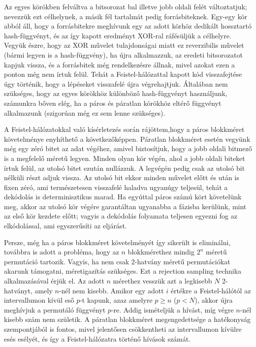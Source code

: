 \documentclass[
    parspace,
    noindent,
    nohyp,
]{elteiktdk}[2023/04/10]
\begin{document}
Az egyes körökben felváltva a bitsorozat bal illetve jobb oldali felét változtatjuk; nevezzük ezt célhelynek, a másik fél tartalmát pedig forrásbiteknek.
Egy-egy kör abból áll, hogy a forrásbitekre meghívunk egy az adott körhöz dedikált hossztartó hash-függvényt,
és az így kapott eredményt XOR-ral ráfésüljük a célhelyre.
Vegyük észre, hogy az XOR művelet tulajdonságai miatt ez reverzibilis művelet (bármi legyen is a hash-függvény),
ha újra alkalmazzuk, az eredeti bitsorozatot kapjuk vissza,
és a forrásbitek még rendelkezésre állnak, mivel azokat ezen a ponton még nem írtuk felül.
Tehát a Feistel-hálózattal kapott kód visszafejtése úgy történik, hogy a lépéseket visszafelé újra végrehajtjuk.
Általában nem szükséges, hogy az egyes körökhöz különböző hash-függvényt használjunk,
számunkra bőven elég, ha a páros és páratlan körökhöz eltérő függvényt alkalmazunk (szigorúan még ez sem lenne szükséges).

A Feistel-hálózatokkal való kísérletezés során rájöttem,hogy a páros blokkméret követelménye enyhíthető a következőképpen.
Páratlan blokkméret esetén vegyünk még egy zéró bitet az adat végéhez,
amivel biztosítjuk, hogy a jobb oldali bitmező is a megfelelő méretű legyen.
Minden olyan kör végén, ahol a jobb oldali biteket írtuk felül, az utolsó bitet ezután nullázzuk.
A legvégén pedig csak az utolsó bit nélküli részt adjuk vissza.
Az utolsó bit ekkor minden művelet előtt és után is fixen zéró,
ami természetesen visszafelé haladva ugyanúgy teljesül, tehát a dekódolás is determinisztikus marad.
Ha egyúttal páros számú kört követelünk meg,
akkor az utolsó kör végére garantáltan ugyanabba a fázisba kerülünk, mint az első kör kezdete előtt;
vagyis a dekódolás folyamata teljesen egyezni fog az elkódolással, ami egyszerűsíti az eljárást.




Persze, még ha a páros blokkméret követelményét így sikerült is eliminálni,
továbbra is adott a probléma, hogy az $n$ blokkmérethez mindig $2^n$ méretű permutáció tartozik.
Vagyis, ha nem csak 2-hatvány méretű permutációkat akarunk támogatni, méretigazítás szükséges.
Ezt a rejection sampling technika alkalmazásával érjük el.
Az adott $n$ mérethez vesszük azt a legkisebb $N$ 2-hatványt, amely $n$-nél nem kisebb.
Amikor egy adott $i$ értékre a Feistel-hálótól az intervallumon kívül eső $p$-t kapunk,
azaz amelyre $p \geq n$ ($p < N$), akkor újra meghívjuk a permutáló függvényt $p$-re.
Addig ismételjük a hívást, míg végre $n$-nél kisebb szám nem születik.
A páratlan blokkméret megengedettsége a hatékonyság szempontjából is fontos,
mivel jelentősen csökkentheti az intervallumon kívülre esés esélyét,
és így a Feistel-hálózatra történő hívások számát.
\end{document}
